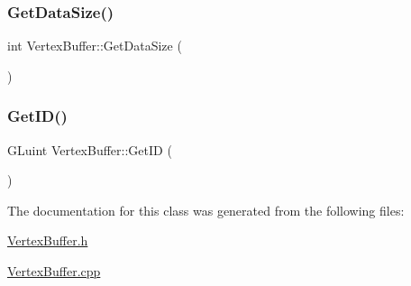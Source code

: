 \subsubsection{\texorpdfstring{Get\+Data\+Size()}{GetDataSize()}}
{\footnotesize\ttfamily int Vertex\+Buffer\+::\+Get\+Data\+Size (\begin{DoxyParamCaption}{ }\end{DoxyParamCaption})}

\mbox{\label{class_vertex_buffer_a1f73043d77c8680af3eb9ddf8250ec35}} 
\subsubsection{\texorpdfstring{Get\+I\+D()}{GetID()}}
{\footnotesize\ttfamily G\+Luint Vertex\+Buffer\+::\+Get\+ID (\begin{DoxyParamCaption}{ }\end{DoxyParamCaption})}



The documentation for this class was generated from the following files\+:\begin{DoxyCompactItemize}
\item 
\mbox{\hyperlink{_vertex_buffer_8h}{Vertex\+Buffer.\+h}}\item 
\mbox{\hyperlink{_vertex_buffer_8cpp}{Vertex\+Buffer.\+cpp}}\end{DoxyCompactItemize}
